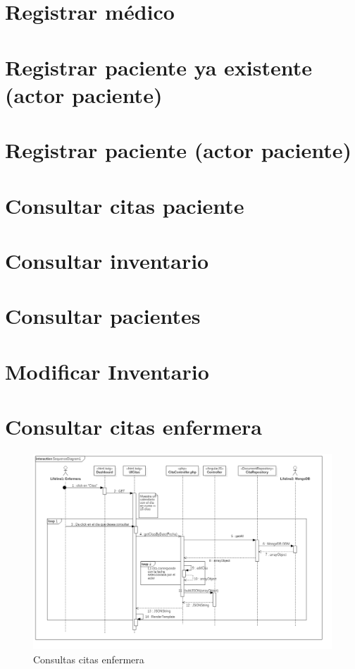 \section{Registrar médico}

\section{Registrar paciente ya existente (actor paciente)}

\section{Registrar paciente (actor paciente)}


\section{Consultar citas paciente}
\section{Consultar inventario}
\section{Consultar pacientes}
\section{Modificar Inventario}

\newpage
\section{Consultar citas enfermera}
\begin{figure}[htbp!]
		\centering
			\includegraphics[width=1\textwidth]{uml/DiagramasSecuencia/Trujillo/getCitasEnfermera}
		\caption{Consultas citas enfermera}
	\end{figure}
	\newpage
